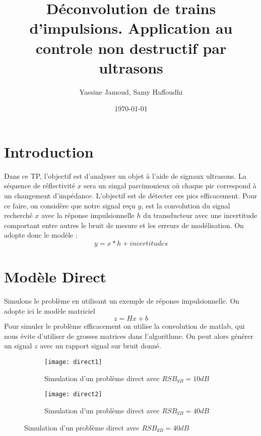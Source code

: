 \documentclass[12pt,a4paper,titlepage]{article}
\title{Déconvolution de trains d’impulsions. Application au controle non destructif par ultrasons}
\author{Yassine Jamoud, Samy Haffoudhi}
\date{\today}
\begin{document}
\maketitle

\section*{Introduction}
Dans ce TP, l'objectif est d'analyser un objet à l'aide de signaux ultrasons. La séquence de réflectivité $x$ sera un singal parcimonieux où chaque pic correspond à un changement d'impédance. L'objectif est de détecter ces pics efficacement. Pour ce faire, on considère que notre signal reçu $y$, est la convolution du signal recherché $x$ avec la réponse impulsionnelle $h$ du transducteur avec une incertitude comportant entre autres le bruit de mesure et les erreurs de modélisation. On adopte donc le modèle :
$$
y=x\ast h + incertitudes
$$

\section{Modèle Direct}
Simulons le problème en utilisant un exemple de réponse impulsionnelle. On adopte ici le modèle matriciel
$$
z=Hx+b
$$
Pour simuler le problème efficacement on utilise la convolution de matlab, qui nous évite d'utiliser de grosses matrices dans l'algorithme. On peut alors générer un signal $z$ avec un rapport signal sur bruit donné.
	\begin{figure}[H]
     		\centering
    		\begin{subfigure}[H]{0.45\textwidth}
         		\centering
         		\texttt{[image: direct1]}
         		\caption{Simulation d'un problème direct avec $RSB_{dB}=10dB$}
    		\end{subfigure}
     		\hfill
    	 	\begin{subfigure}[H]{0.45\textwidth}
         		\centering
         		\texttt{[image: direct2]}
         		\caption{Simulation d'un problème direct avec $RSB_{dB}=40dB$}
     		\end{subfigure}
	\end{figure}
\end{document}
